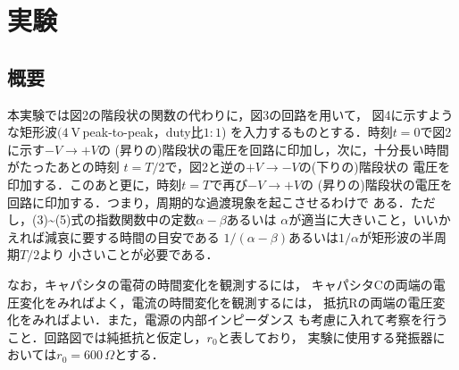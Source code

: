 
\section{実験}

\subsection{概要}
    本実験では図2の階段状の関数の代わりに，図3の回路を用いて，
    図4に示すような矩形波$(4\mathrm{~V}$\,peak-to-peak，duty比$1: 1$)
    を入力するものとする．時刻$t=0$で図2に示す$-V \rightarrow+V$の
    (昇りの)階段状の電圧を回路に印加し，次に，十分長い時間がたったあとの時刻
    $t=T / 2$で，図2と逆の$+V \rightarrow-V$の(下りの)階段状の
    電圧を印加する．このあと更に，時刻$t=T$で再び$-V \rightarrow+V$の
    (昇りの)階段状の電圧を回路に印加する．つまり，周期的な過渡現象を起こさせるわけで
    ある．ただし，(3)\sim(5)式の指数関数中の定数$\alpha-\beta$あるいは
    $\alpha$が適当に大きいこと，いいかえれば減哀に要する時間の目安である
    $1 /(\alpha-\beta)$あるいは$1 / \alpha$が矩形波の半周期$T / 2$より
    小さいことが必要である．
    
    なお，キャパシタの電荷の時間変化を観測するには，
    キャパシタCの両端の電圧変化をみればよく，電流の時間変化を観測するには，
    抵抗$\mathrm{R}$の両端の電圧変化をみればよい．また，電源の内部インピーダンス
    も考慮に入れて考察を行うこと．回路図では純抵抗と仮定し，$r_0$と表しており，
    実験に使用する発振器においては$r_0=600\,\Omega$とする．

